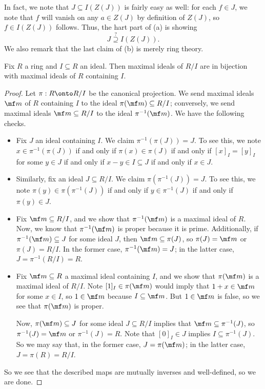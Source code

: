 In fact, we note that $J\subseteq I(Z(J))$ is fairly easy as well: for each $f\in J$, we note that $f$ will vanish on any $a\in Z(J)$ by definition of $Z(J)$, so $f\in I(Z(J))$ follows. Thus, the hart part of (a) is showing
\[J\stackrel?\supseteq I(Z(J)).\]
We also remark that the last claim of (b) is merely ring theory.
\begin{lemma} \label{lem:pullmax}
	Fix $R$ a ring and $I\subseteq R$ an ideal. Then maximal ideals of $R/I$ are in bijection with maximal ideals of $R$ containing $I$.
\end{lemma}
\begin{proof}
	Let $\pi:R\onto R/I$ be the canonical projection. We send maximal ideals $\mf m$ of $R$ containing $I$ to the ideal $\pi(\mf m)\subseteq R/I$; conversely, we send maximal ideals $\mf m\subseteq R/I$ to the ideal $\pi^{-1}(\mf m)$. We have the following checks.
	\begin{itemize}
		\item Fix $J$ an ideal containing $I$. We claim $\pi^{-1}(\pi(J))=J$. To see this, we note $x\in\pi^{-1}(\pi(J))$ if and only if $\pi(x)\in\pi(J)$ if and only if $[x]_I=[y]_I$ for some $y\in J$ if and only if $x-y\in I\subseteq J$ if and only if $x\in J$.
		\item Similarly, fix an ideal $J\subseteq R/I$. We claim $\pi\left(\pi^{-1}(J)\right)=J$. To see this, we note $\pi(y)\in\pi\left(\pi^{-1}(J)\right)$ if and only if $y\in\pi^{-1}(J)$ if and only if $\pi(y)\in J$.
		\item Fix $\mf m\subseteq R/I$, and we show that $\pi^{-1}(\mf m)$ is a maximal ideal of $R$. Now, we know that $\pi^{-1}(\mf m)$ is proper because it is prime. Additionally, if $\pi^{-1}(\mf m)\subseteq J$ for some ideal $J$, then $\mf m\subseteq\pi(J)$, so $\pi(J)=\mf m$ or $\pi(J)=R/I$. In the former case, $\pi^{-1}(\mf m)=J$; in the latter case, $J=\pi^{-1}(R/I)=R$.
		\item Fix $\mf m\subseteq R$ a maximal ideal containing $I$, and we show that $\pi(\mf m)$ is a maximal ideal of $R/I$. Note $[1]_I\in\pi(\mf m)$ would imply that $1+x\in\mf m$ for some $x\in I$, so $1\in\mf m$ because $I\subseteq\mf m$. But $1\in\mf m$ is false, so we see that $\pi(\mf m)$ is proper.

		Now, $\pi(\mf m)\subseteq J$ for some ideal $J\subseteq R/I$ implies that $\mf m\subseteq\pi^{-1}(J)$, so $\pi^{-1}(J)=\mf m$ or $\pi^{-1}(J)=R$. Note that $[0]_I\in J$ implies $I\subseteq\pi^{-1}(J)$. So we may say that, in the former case, $J=\pi(\mf m)$; in the latter case, $J=\pi(R)=R/I$.
	\end{itemize}
	So we see that the described maps are mutually inverses and well-defined, so we are done.
\end{proof}
